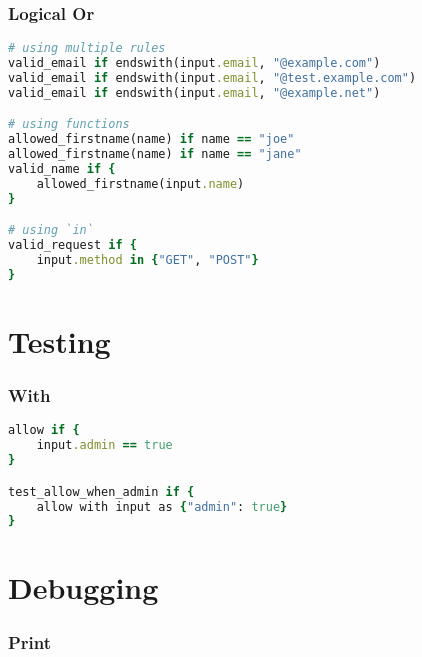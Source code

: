 \documentclass[twocolumn]{article}
\begin{document}
\vspace{-1em}
\subsubsection*{Logical Or}

\begin{lstlisting}[language=Ruby]
# using multiple rules
valid_email if endswith(input.email, "@example.com")
valid_email if endswith(input.email, "@test.example.com")
valid_email if endswith(input.email, "@example.net")

# using functions
allowed_firstname(name) if name == "joe"
allowed_firstname(name) if name == "jane"
valid_name if {
	allowed_firstname(input.name)
}

# using `in`
valid_request if {
	input.method in {"GET", "POST"}
}
\end{lstlisting}









\section*{Testing}




\vspace{-1em}
\subsubsection*{With}

\begin{lstlisting}[language=Ruby]
allow if {
	input.admin == true
}

test_allow_when_admin if {
	allow with input as {"admin": true}
}
\end{lstlisting}









\section*{Debugging}




\vspace{-1em}
\subsubsection*{Print}
\end{document}
